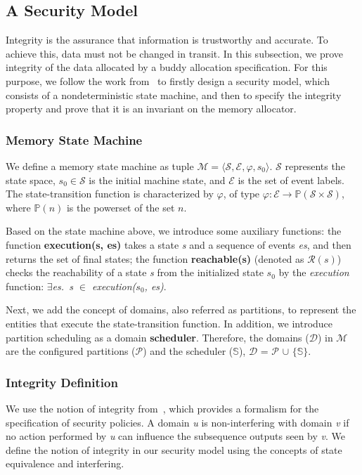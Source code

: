 \subsection{A Security Model}\label{sec:securitymodel}
Integrity is the assurance that information is trustworthy and accurate. To achieve this, data must not be changed in transit. In this subsection, we prove integrity of the data allocated by a buddy allocation specification. For this purpose, we follow the work from~\cite{reg_securitymodel} to firstly design a security model, which consists of a nondeterministic state machine, and then to specify the integrity property and prove that it is an invariant on the memory allocator.

\subsubsection{Memory State Machine}
We define a memory state machine as tuple $\mathcal{M} = \langle \mathcal{S}, \mathcal{E}, \varphi, s_0 \rangle$. $\mathcal{S}$ represents the state space,  $s_0 \in \mathcal{S}$ is the initial machine state, and $\mathcal{E}$ is the set of event labels. The state-transition function is characterized by $\varphi$, of type $\varphi: \mathcal{E} \rightarrow \mathbb{P}(\mathcal{S} \times \mathcal{S})$, where $\mathbb{P}(n)$ is the powerset of the set $n$.

Based on the state machine above, we introduce some auxiliary functions: the function \textbf{execution(s, es)} takes a state \emph{s} and a sequence of events \emph{es}, and then returns the set of final states; the function \textbf{reachable(s)} (denoted as $\mathcal{R}(s)$) checks the reachability of a state \emph{s} from the initialized state $s_0$ by the \emph{execution} function: \emph{$\exists$es.\ s $\in$ execution($s_0$, es)}.

Next, we add the concept of domains, also referred as partitions, to represent the entities that execute the state-transition function. In addition, we introduce partition scheduling as a domain \textbf{scheduler}. Therefore, the domains ($\mathcal{D}$) in $\mathcal{M}$ are the configured partitions ($\mathcal{P}$) and the scheduler ($\mathbb{S}$), $\mathcal{D}$ = $\mathcal{P}$ $\cup$ $\lbrace$$\mathbb{S}$$\rbrace$.

\subsubsection{Integrity Definition}
We use the notion of integrity from~\cite{reg_noninterference}, which provides a formalism for the specification of security policies. A domain \emph{u} is non-interfering with domain \emph{v} if no action performed by \emph{u} can influence the subsequence outputs seen by \emph{v}. We define the notion of integrity in our security model using the concepts of state equivalence and interfering.

